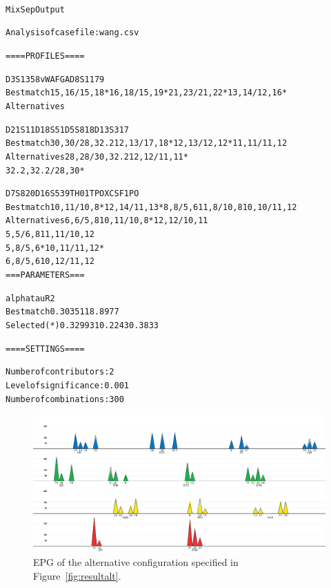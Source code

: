 \documentclass[a4paper,11pt]{article}
\newenvironment{example}{\begin{alltt}\small}{\end{alltt}}
\begin{document}
\begin{example}
  \label{page:example}
MixSep Output

Analysis of case file: wang.csv 

==== PROFILES ====

             D3S1358       vWA           FGA           D8S1179      
Best match   15,16/15,18*  16,18/15,19*  21,23/21,22*  13,14/12,16* 
Alternatives                                                        
                                                                    
                                                                    
                                                                    
             D21S11            D18S51        D5S818        D13S317      
Best match   30,30/28,32.2     12,13/17,18*  12,13/12,12*  11,11/11,12  
Alternatives 28,28/30,32.2                                 12,12/11,11* 
             32.2,32.2/28,30*                                           
                                                                        
                                                                        
             D7S820       D16S539       TH01      TPOX         CSF1PO       
Best match   10,11/10,8*  12,14/11,13*  8,8/5,6   11,8/10,8    10,10/11,12  
Alternatives                            6,6/5,8   10,11/10,8*  12,12/10,11  
                                        5,5/6,8                11,11/10,12  
                                        5,8/5,6*               10,11/11,12* 
                                        6,8/5,6                10,12/11,12  
=== PARAMETERS ===

             alpha  tau      R2    
Best match   0.3035 118.8977       
Selected (*) 0.3299 310.2243 0.3833


==== SETTINGS ====

Number of contributors: 2 
Level of significance: 0.001 
Number of combinations: 300 
\end{example}

\begin{figure}[!h]
  \centering
  \includegraphics[width=15cm]{plot_alternative}
  \caption{\label{fig:plotalt}EPG of the alternative configuration
    specified in Figure~\ref{fig:resultalt}.}
\end{figure}
\end{document}
